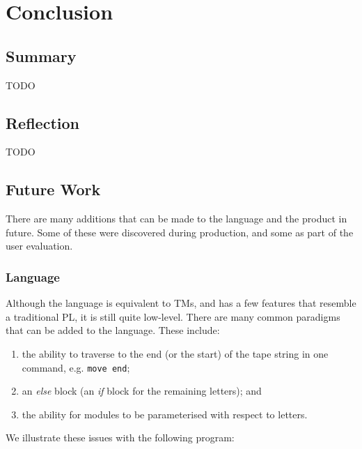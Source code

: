 \chapter{Conclusion}


\section{Summary}
TODO



\section{Reflection}
TODO

\section{Future Work}

There are many additions that can be made to the language and the product in future. Some of these were discovered during production, and some as part of the user evaluation.

\subsection{Language}
Although the language is equivalent to TMs, and has a few features that resemble a traditional PL, it is still quite low-level. There are many common paradigms that can be added to the language. These include:
\begin{enumerate}
    \item the ability to traverse to the end (or the start) of the tape string in one command, e.g. \texttt{move end}; 
    \item an \textit{else} block (an \textit{if} block for the remaining letters); and
    \item the ability for modules to be parameterised with respect to letters.
\end{enumerate}
We illustrate these issues with the following program:


